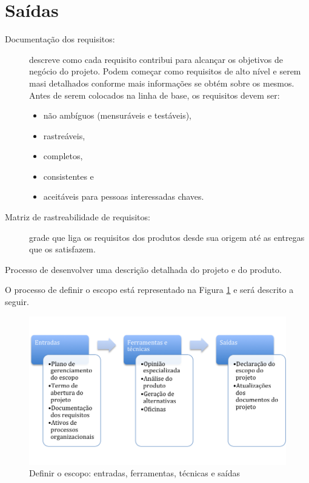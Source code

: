 \section{Saídas}

\begin{description}
	
	\item[Documentação dos requisitos:] descreve como cada requisito contribui para alcançar os objetivos de negócio do projeto. Podem começar como requisitos de alto nível e serem masi detalhados conforme mais informações se obtém sobre os mesmos. Antes de serem colocados na linha de base, os requisitos devem ser:
	
		\begin{itemize}
			\item não ambíguos (mensuráveis e testáveis),
			\item rastreáveis,
			\item completos,
			\item consistentes e
			\item aceitáveis para pessoas interessadas chaves.
		\end{itemize}
	
	\item[Matriz de rastreabilidade de requisitos:] grade que liga os requisitos dos produtos desde sua origem até as entregas que os satisfazem.
	
\end{description}


Processo de desenvolver uma descrição detalhada do projeto e do produto. 

O processo de definir o escopo está representado na Figura \ref{fig:escopo:def:efts} e será descrito a seguir.

\begin{figure}[!h]
	\centering
	\includegraphics[scale=0.5]{Figuras/escopo_efts_definir.png}
	\caption{Definir o escopo: entradas, ferramentas, técnicas e saídas}
	\label{fig:escopo:def:efts}
\end{figure}


